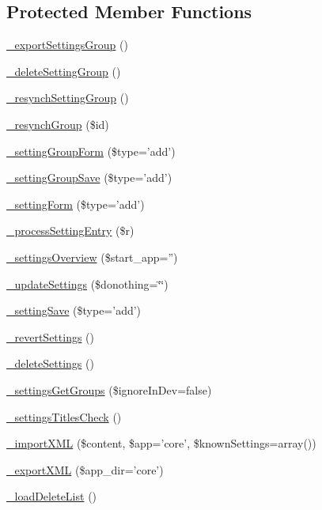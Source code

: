 \subsection*{Protected Member Functions}
\begin{DoxyCompactItemize}
\item 
\hyperlink{classadmin__core__settings__settings_afa0b526296d519ee9c8c2755ab29dc55}{\-\_\-export\-Settings\-Group} ()
\item 
\hyperlink{classadmin__core__settings__settings_ac87c48598b767d9caae8e6586d258689}{\-\_\-delete\-Setting\-Group} ()
\item 
\hyperlink{classadmin__core__settings__settings_a0af3a133f19f49fb9a1c3bca82bb98f1}{\-\_\-resynch\-Setting\-Group} ()
\item 
\hyperlink{classadmin__core__settings__settings_a813de339e35f610d52e8b6cf6c4bf07c}{\-\_\-resynch\-Group} (\$id)
\item 
\hyperlink{classadmin__core__settings__settings_aec20f271ab8c24c320e736ca61a0e763}{\-\_\-setting\-Group\-Form} (\$type='add')
\item 
\hyperlink{classadmin__core__settings__settings_add14e627296dadf07c4c2b32201e20b0}{\-\_\-setting\-Group\-Save} (\$type='add')
\item 
\hyperlink{classadmin__core__settings__settings_a6bdc58f3ff3a8443e71d9d99a100c819}{\-\_\-setting\-Form} (\$type='add')
\item 
\hyperlink{classadmin__core__settings__settings_a6d1944bf664cfaf2fd0b046beca9367b}{\-\_\-process\-Setting\-Entry} (\$r)
\item 
\hyperlink{classadmin__core__settings__settings_aa01c5069d29c8992279ef256533a68a2}{\-\_\-settings\-Overview} (\$start\-\_\-app='')
\item 
\hyperlink{classadmin__core__settings__settings_abacc904cf3a426615206f1b10c54e9c9}{\-\_\-update\-Settings} (\$donothing=\char`\"{}\char`\"{})
\item 
\hyperlink{classadmin__core__settings__settings_a9e7c39ae96ac524ac1f70ae914ef5e1b}{\-\_\-setting\-Save} (\$type='add')
\item 
\hyperlink{classadmin__core__settings__settings_a154fb91ca8a521af44ca8ff504fa3f01}{\-\_\-revert\-Settings} ()
\item 
\hyperlink{classadmin__core__settings__settings_aff014a595fafb31472e8d71495eb57f8}{\-\_\-delete\-Settings} ()
\item 
\hyperlink{classadmin__core__settings__settings_a0084a89f32d5a301f8623ef0b880ea2b}{\-\_\-settings\-Get\-Groups} (\$ignore\-In\-Dev=false)
\item 
\hyperlink{classadmin__core__settings__settings_a2f3a2384f897b45730c12381ef4483fe}{\-\_\-settings\-Titles\-Check} ()
\item 
\hyperlink{classadmin__core__settings__settings_aa75d349528d5aa2ae5e8323fbb843930}{\-\_\-import\-X\-M\-L} (\$content, \$app='core', \$known\-Settings=array())
\item 
\hyperlink{classadmin__core__settings__settings_ae55980ad60360b8f7f6885ed82507842}{\-\_\-export\-X\-M\-L} (\$app\-\_\-dir='core')
\item 
\hyperlink{classadmin__core__settings__settings_a4aea79d8419c73e70025d0aa5e71a314}{\-\_\-load\-Delete\-List} ()
\end{DoxyCompactItemize}
